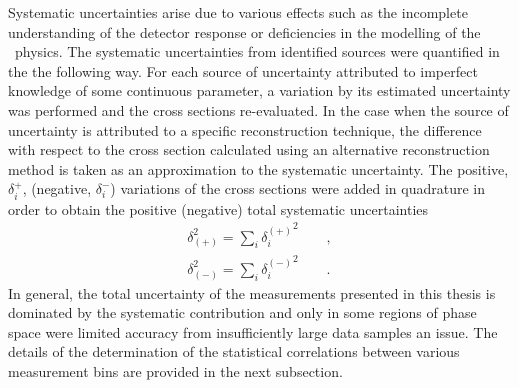 Systematic uncertainties arise due to various effects such as the incomplete understanding of the detector response or deficiencies in the modelling of the \ep~physics. The systematic uncertainties from identified sources were quantified in the the following way. For each source of uncertainty attributed to imperfect knowledge of some continuous parameter, a variation by its estimated uncertainty was performed and the cross sections re-evaluated. In the case when the source of uncertainty is attributed to a specific reconstruction technique, the difference with respect to the cross section calculated using an alternative reconstruction method is taken as an approximation to the systematic uncertainty. The positive, $\delta^+_i$, (negative, $\delta^-_i$) variations of the cross sections were added in quadrature in order to obtain the positive (negative) total systematic uncertainties
\[
	\begin{aligned}
		\delta_{\left( +\right)}^{2} = \sum_i{\mbox{$\delta_i^{\left( +\right)}$}^2}\qquad,\\
		\delta_{\left( -\right)}^{2} = \sum_i{\mbox{$\delta_i^{\left( -\right)}$}^2}\qquad.
	\end{aligned}
\]
In general, the total uncertainty of the measurements presented in this thesis is dominated by the systematic contribution and only in some regions of phase space were limited accuracy from insufficiently large data samples an issue. The details of the determination of the statistical correlations between various measurement bins are provided in the next subsection.

